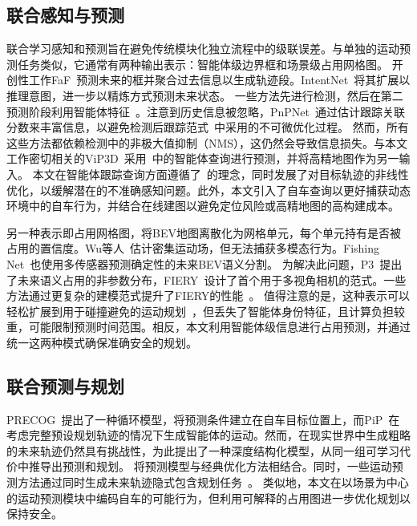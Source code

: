 \documentclass[10pt,twocolumn,letterpaper]{article}
\begin{document}
\subsection{联合感知与预测}
联合学习感知和预测旨在避免传统模块化独立流程中的级联误差。与单独的运动预测任务类似，它通常有两种输出表示：智能体级边界框和场景级占用网格图。
%
开创性工作FaF~\cite{luo2018faf}预测未来的框并聚合过去信息以生成轨迹段。IntentNet~\cite{casas2018intentnet}将其扩展以推理意图，\cite{djuric2021multixnet, fadadu2022multixnetfusion}进一步以精炼方式预测未来状态。
%
一些方法先进行检测，然后在第二预测阶段利用智能体特征~\cite{casas2020spagnn, li2020contextual, peri2022futuredet}。注意到历史信息被忽略，PnPNet~\cite{liang2020pnpnet}通过估计跟踪关联分数来丰富信息，以避免检测后跟踪范式~\cite{li2022uvtr, shi2022srcn3d, liu2022bevfusion, yang2022qtrack}中采用的不可微优化过程。
%
然而，所有这些方法都依赖检测中的非极大值抑制（NMS），这仍然会导致信息损失。与本文工作密切相关的ViP3D~\cite{gu2022vip3d}采用~\cite{zhang2022mutr3d}中的智能体查询进行预测，并将高精地图作为另一输入。
%
本文在智能体跟踪查询方面遵循了~\cite{zhang2022mutr3d, gu2022vip3d}的理念，同时发展了对目标轨迹的非线性优化，以缓解潜在的不准确感知问题。此外，本文引入了自车查询以更好捕获动态环境中的自车行为，并结合在线建图以避免定位风险或高精地图的高构建成本。

另一种表示即占用网格图，将BEV地图离散化为网格单元，每个单元持有是否被占用的置信度。Wu等人~\cite{wu2020motionnet}估计密集运动场，但无法捕获多模态行为。Fishing Net~\cite{hendy2020fishingnet}也使用多传感器预测确定性的未来BEV语义分割。
%
为解决此问题，P3~\cite{sadat2020p3}提出了未来语义占用的非参数分布，FIERY~\cite{hu2021fiery}设计了首个用于多视角相机的范式。一些方法通过更复杂的建模范式提升了FIERY的性能~\cite{hu2022stp3, akan2022stretchbev, zhang2022beverse}。
%
值得注意的是，这种表示可以轻松扩展到用于碰撞避免的运动规划~\cite{sadat2020p3, casas2021mp3, hu2022stp3}，但丢失了智能体身份特征，且计算负担较重，可能限制预测时间范围。相反，本文利用智能体级信息进行占用预测，并通过统一这两种模式确保准确安全的规划。

\subsection{联合预测与规划} PRECOG~\cite{rhinehart2019precog}提出了一种循环模型，将预测条件建立在自车目标位置上，而PiP~\cite{song2020pip}在考虑完整预设规划轨迹的情况下生成智能体的运动。然而，在现实世界中生成粗略的未来轨迹仍然具有挑战性，\cite{liu2021reactive}为此提出了一种深度结构化模型，从同一组可学习代价中推导出预测和规划。
%
\cite{ivanovic2021mats, huang2022differentiable}将预测模型与经典优化方法相结合。同时，一些运动预测方法通过同时生成未来轨迹隐式包含规划任务~\cite{chai2020multipath, ngiam2021scenetransformer, kamenev2022predictionnet}。
%
类似地，本文在以场景为中心的运动预测模块中编码自车的可能行为，但利用可解释的占用图进一步优化规划以保持安全。
\end{document}
